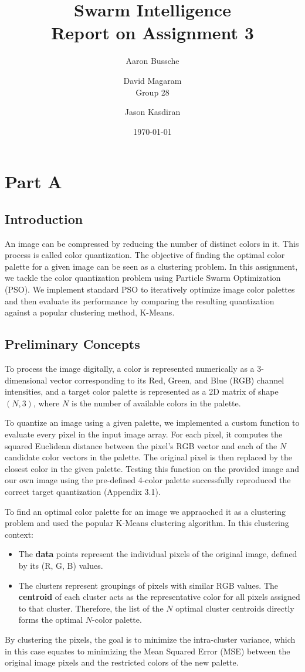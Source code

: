\documentclass{article}
\title{Swarm Intelligence\\[0.3em] \large Report on Assignment 3}
\author{Aaron Bussche \and  David Magaram\\[0.3em] Group 28 \and Jason Kasdiran}
\date{\today}
\begin{document}
\maketitle

\section{Part A}
\subsection{Introduction}
An image can be compressed by reducing the number of distinct colors in it. This process is called color 
quantization. The objective of finding the optimal color palette for a given image can be seen as a 
clustering problem. In this assignment, we tackle the color quantization problem using Particle Swarm 
Optimization (PSO). We implement standard PSO to iteratively optimize image color palettes and then evaluate its 
performance by comparing the resulting quantization against a popular clustering method, K-Means.

\subsection{Preliminary Concepts}
To process the image digitally, a color is represented numerically as a 3-dimensional vector corresponding 
to its Red, Green, and Blue (RGB) channel intensities, and a target color palette is represented as a 2D 
matrix of shape $(N, 3)$, where $N$ is the number of available colors in the palette.

To quantize an image using a given palette, we implemented a custom function to evaluate every pixel in the 
input image array. For each pixel, it computes the squared Euclidean distance between the pixel's RGB vector 
and each of the $N$ candidate color vectors in the palette. The original pixel is then replaced by the closest
color in the given palette. Testing this function on the provided image and our own image using the pre-defined 
4-color palette successfully reproduced the correct target quantization (Appendix 3.1).

To find an optimal color palette for an image we appraoched it as a clustering problem and used the popular 
K-Means clustering algorithm. In this clustering context:
\begin{itemize}[noitemsep, nolistsep]
    \item The \textbf{data} points represent the individual pixels of the original image, defined by its (R, G, B) values.
    \item The clusters represent groupings of pixels with similar RGB values. The \textbf{centroid} of each cluster acts 
    as the representative color for all pixels assigned to that cluster. Therefore, the list of the $N$ optimal cluster 
    centroids directly forms the optimal $N$-color palette.
\end{itemize}
By clustering the pixels, the goal is to minimize the intra-cluster variance, which in this case equates to minimizing 
the Mean Squared Error (MSE) between the original image pixels and the restricted colors of the new palette.
\end{document}

